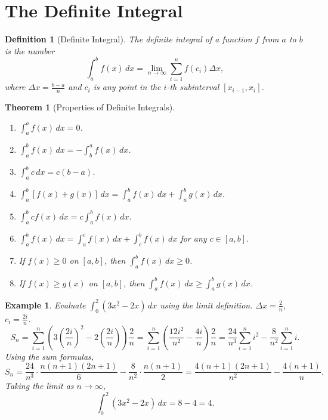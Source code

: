 \documentclass[11pt,a4paper]{article}
\newtheorem{example}{Example}
\newtheorem{theorem}{Theorem}
\newtheorem{definition}{Definition}
\begin{document}
\section{The Definite Integral}
\begin{definition}[Definite Integral]
The \textit{definite integral} of a function $f$ from $a$ to $b$ is the number
\[
\int_a^b f(x) \, dx = \lim_{n \to \infty} \sum_{i=1}^n f(c_i) \Delta x,
\]
where $\Delta x = \frac{b - a}{n}$ and $c_i$ is any point in the $i$-th subinterval $[x_{i-1}, x_i]$.
\end{definition}
\begin{theorem}[Properties of Definite Integrals]
\begin{enumerate}
\item $\displaystyle \int_a^a f(x) \, dx = 0$.
\item $\displaystyle \int_a^b f(x) \, dx = -\int_b^a f(x) \, dx$.
\item $\displaystyle \int_a^b c \, dx = c(b - a)$.
\item $\displaystyle \int_a^b [f(x) + g(x)] \, dx = \int_a^b f(x) \, dx + \int_a^b g(x) \, dx$.
\item $\displaystyle \int_a^b c f(x) \, dx = c \int_a^b f(x) \, dx$.
\item $\displaystyle \int_a^b f(x) \, dx = \int_a^c f(x) \, dx + \int_c^b f(x) \, dx$ for any $c \in [a, b]$.
\item If $f(x) \geq 0$ on $[a, b]$, then $\displaystyle \int_a^b f(x) \, dx \geq 0$.
\item If $f(x) \geq g(x)$ on $[a, b]$, then $\displaystyle \int_a^b f(x) \, dx \geq \int_a^b g(x) \, dx$.
\end{enumerate}
\end{theorem}
\begin{example}
Evaluate $\displaystyle \int_0^2 (3x^2 - 2x) \, dx$ using the limit definition.
$\Delta x = \frac{2}{n}$, $c_i = \frac{2i}{n}$.
\[
S_n = \sum_{i=1}^n \left( 3\left( \frac{2i}{n} \right)^2 - 2\left( \frac{2i}{n} \right) \right) \frac{2}{n} = \sum_{i=1}^n \left( \frac{12i^2}{n^2} - \frac{4i}{n} \right) \frac{2}{n} = \frac{24}{n^3} \sum_{i=1}^n i^2 - \frac{8}{n^2} \sum_{i=1}^n i.
\]
Using the sum formulas,
\[
S_n = \frac{24}{n^3} \cdot \frac{n(n+1)(2n+1)}{6} - \frac{8}{n^2} \cdot \frac{n(n+1)}{2} = \frac{4(n+1)(2n+1)}{n^2} - \frac{4(n+1)}{n}.
\]
Taking the limit as $n \to \infty$,
\[
\int_0^2 (3x^2 - 2x) \, dx = 8 - 4 = 4.
\]
\end{example}
\end{document}
